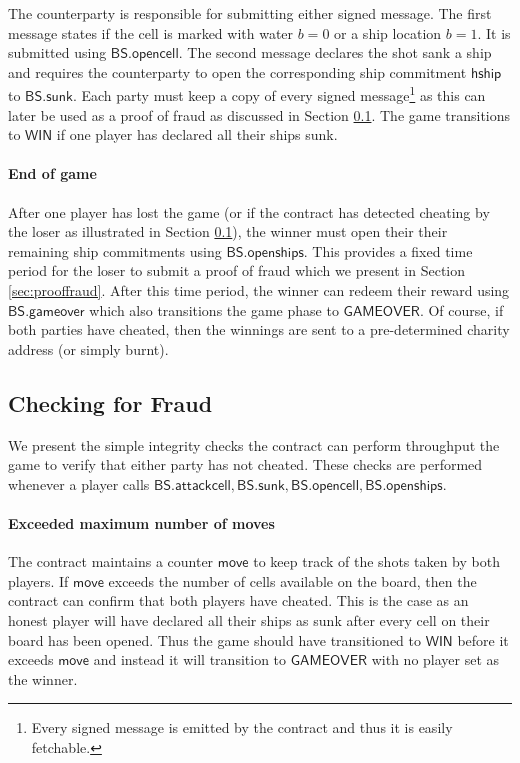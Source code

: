 \documentclass{llncs}
\newcommand{\gamewinner}{\mathsf{WIN}}
\newcommand{\gamefinished}{\mathsf{GAMEOVER}}
\newcommand{\hship}{\mathsf{hship}}
\newcommand{\battleshipattackcell}{\mathsf{BS.attackcell}}
\newcommand{\battleshiprevealcell}{\mathsf{BS.opencell}}
\newcommand{\battleshipsinking}{\mathsf{BS.sunk}}
\newcommand{\battleshiprevealships}{\mathsf{BS.openships}}
\newcommand{\battleshipgameover}{\mathsf{BS.gameover}}
\begin{document}
The counterparty is responsible for submitting either signed message. 
The first message states if the cell is marked with water $b=0$ or a ship location $b=1$.
It is submitted using $\battleshiprevealcell$.
The second message declares the shot sank a ship and requires the counterparty to open the corresponding ship commitment $\hship$ to $\battleshipsinking$. 
Each party must keep a copy of every signed message\footnote{Every signed message is emitted by the contract and thus it is easily fetchable.} as this can later be used as a proof of fraud as discussed in Section \ref{sec:fraud}.
The game transitions to $\gamewinner$ if one player has declared all their ships sunk. 

\paragraph{End of game} 
After one player has lost the game (or if the contract has detected cheating by the loser as illustrated in Section \ref{sec:fraud}), the winner must open their their remaining ship commitments  using $\battleshiprevealships$.
This provides a fixed time period for the loser to submit a proof of fraud which we present in Section \ref{sec:prooffraud}.
After this time period, the winner can redeem their reward using $\battleshipgameover$ which also transitions the game phase to $\gamefinished$. 
Of course, if both parties have cheated, then the winnings are sent to a pre-determined charity address (or simply burnt). 

\subsection{Checking for Fraud} \label{sec:fraud}

We present the simple integrity checks the contract can perform throughput the game to verify that either party has not cheated. 
These checks are performed whenever a player calls $\battleshipattackcell, \battleshipsinking, \battleshiprevealcell, \battleshiprevealships$.


\paragraph{Exceeded maximum number of moves} 
The contract maintains a counter $\mathsf{move}$ to keep track of the shots taken by both players. 
If $\mathsf{move}$ exceeds the number of cells available on the board, then the contract can confirm that both players have cheated.
This is the case as an honest player will have declared all their ships as sunk after every cell on their board has been opened.
Thus the game should have transitioned to $\gamewinner$ before it exceeds $\mathsf{move}$ and instead it will transition to $\gamefinished$ with no player set as the winner. 
\end{document}
